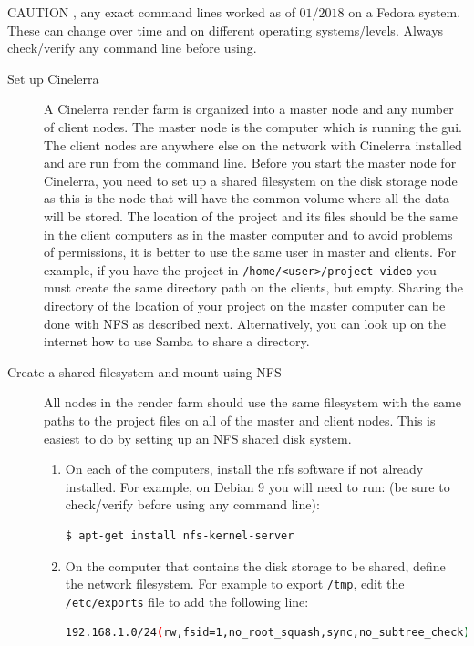{\color{red} CAUTION }, any exact command lines worked as of $01/2018$ on a Fedora system.  These can change over time and on different operating systems/levels.  Always check/verify any command line before using.

\begin{description}
    \item[Set up Cinelerra] A Cinelerra render farm is organized into a master node and any number of client nodes.  The master node is the computer which is running the gui.  The client nodes are anywhere else on the network with Cinelerra installed and are run from the command line.  Before you start the master node for Cinelerra, you need to set up a shared filesystem on the disk storage node as this is the node that will have the common volume where all the data will be stored.  
    The location of the project and its files should be the same in the client computers as in the master computer and to avoid problems of permissions, it is better to use the same user in master and clients. 
    For example, if you have the project in \texttt{/home/<user>/project-video} you must create the same directory path on the clients, but empty.  Sharing the directory of the location of your project on the master computer can be done with NFS as described next.  Alternatively, you can look up on the internet how to use Samba to share a directory.
    \item[Create a shared filesystem and mount using NFS] All nodes in the render farm should use the same filesystem with the same paths to the project files on all of the master and client nodes.  This is easiest to do by setting up an NFS shared disk system.
    \begin{enumerate}
        \item On each of the computers, install the nfs software if not already installed.  For example, on Debian 9
        you will need to run: (be sure to check/verify before using any command line):
        \begin{lstlisting}[language=bash,numbers=none]
$ apt-get install nfs-kernel-server
        \end{lstlisting}
        \item On the computer that contains the disk storage to be shared, define the network filesystem.  For
        example to export \texttt{/tmp}, edit the \texttt{/etc/exports} file to add the following line:
        \begin{lstlisting}[language=bash,numbers=none]
192.168.1.0/24(rw,fsid=1,no_root_squash,sync,no_subtree_check)

\end{lstlisting}
\end{enumerate}
\end{description}
